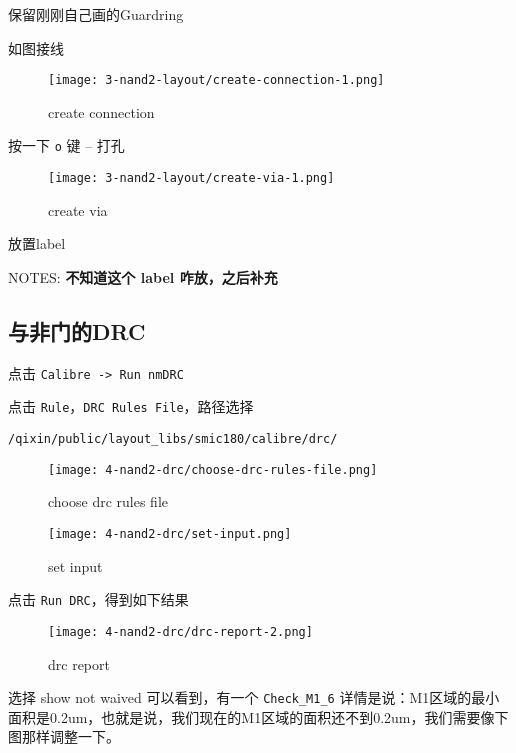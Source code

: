 \documentclass{theme-2614084}
\begin{document}
保留刚刚自己画的Guardring

如图接线

\begin{figure}[H]
  \centering\texttt{[image: 3-nand2-layout/create-connection-1.png]}
  \caption{create connection}
\end{figure}

按一下 \texttt{o} 键 -- 打孔

\begin{figure}[H]
  \centering\texttt{[image: 3-nand2-layout/create-via-1.png]}
  \caption{create via}
\end{figure}

放置label

NOTES: \textbf{不知道这个 label 咋放，之后补充}

\subsection{与非门的DRC}

点击 \texttt{Calibre -> Run nmDRC}

点击 \texttt{Rule}，\texttt{DRC Rules File}，路径选择

\begin{verbatim}
/qixin/public/layout_libs/smic180/calibre/drc/
\end{verbatim}

\begin{figure}[htbp]
  \centering\begin{minipage}[t]{0.48\textwidth}
      \centering\texttt{[image: 4-nand2-drc/choose-drc-rules-file.png]}
      \caption{choose drc rules file}
  \end{minipage}
  \centering\begin{minipage}[t]{0.48\textwidth}
      \centering\texttt{[image: 4-nand2-drc/set-input.png]}
      \caption{set input}
  \end{minipage}
\end{figure}

点击 \texttt{Run DRC}，得到如下结果

\begin{figure}[H]
  \centering\texttt{[image: 4-nand2-drc/drc-report-2.png]}
  \caption{drc report}
\end{figure}

选择 show not waived
可以看到，有一个 \texttt{Check\_M1\_6} 详情是说：M1区域的最小面积是0.2um，也就是说，我们现在的M1区域的面积还不到0.2um，我们需要像下图那样调整一下。
\end{document}
